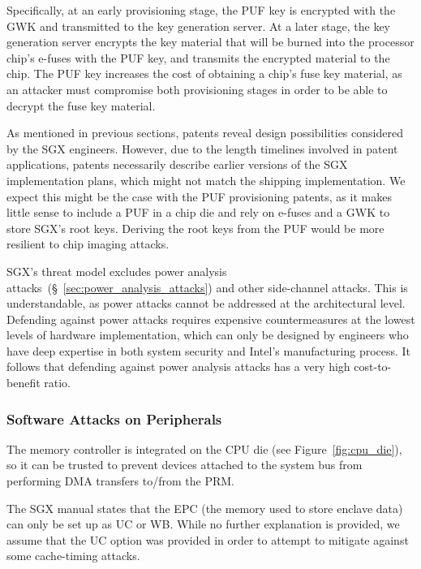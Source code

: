 Specifically, at an early provisioning stage, the PUF key is encrypted with the
GWK and transmitted to the key generation server. At a later stage, the key
generation server encrypts the key material that will be burned into the
processor chip's e-fuses with the PUF key, and transmits the encrypted material
to the chip. The PUF key increases the cost of obtaining a chip's fuse key
material, as an attacker must compromise both provisioning stages in order to
be able to decrypt the fuse key material.

As mentioned in previous sections, patents reveal design possibilities
considered by the SGX engineers. However, due to the length timelines involved
in patent applications, patents necessarily describe earlier versions of the
SGX implementation plans, which might not match the shipping implementation. We
expect this might be the case with the PUF provisioning patents, as it makes
little sense to include a PUF in a chip die and rely on e-fuses and a GWK to
store SGX's root keys. Deriving the root keys from the PUF would be more
resilient to chip imaging attacks.

SGX's threat model excludes power analysis
attacks~(\S~\ref{sec:power_analysis_attacks}) and other side-channel attacks.
This is understandable, as power attacks cannot be addressed at the
architectural level. Defending against power attacks requires expensive
countermeasures at the lowest levels of hardware implementation, which can only
be designed by engineers who have deep expertise in both system security and
Intel's manufacturing process. It follows that defending against power analysis
attacks has a very high cost-to-benefit ratio.


\subsubsection{Software Attacks on Peripherals}
\label{sec:sgx_vs_device_attacks}



The memory controller is
integrated on the CPU die (see Figure~\ref{fig:cpu_die}), so it can be trusted
to prevent devices attached to the system bus from performing DMA transfers
to/from the PRM.




The SGX manual states that the EPC (the memory used to store enclave data) can
only be set up as UC or WB. While no further explanation is provided, we assume
that the UC option was provided in order to attempt to mitigate against some
cache-timing attacks.


